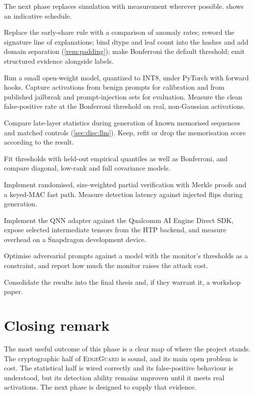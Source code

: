 The next phase replaces simulation with measurement wherever possible.  shows an
indicative schedule.

\begin{description}[leftmargin=*,style=nextline]
  \item[W1 — Fixes from this evaluation.] Replace the early-share rule with a comparison of
        anomaly rates; reword the signature line of explanations; bind dtype and leaf count into
        the hashes and add domain separation (\cref{rem:padding}); make Bonferroni the default
        threshold; emit structured evidence alongside labels.
  \item[W2 — Real activations.] Run a small open-weight model, quantized to INT8, under PyTorch
        with forward hooks. Capture activations from benign prompts for calibration and from
        published jailbreak and prompt-injection sets for evaluation. Measure the clean
        false-positive rate at the Bonferroni threshold on real, non-Gaussian activations.
  \item[W3 — Memorisation hypothesis.] Compare late-layer statistics during generation of known
        memorised sequences and matched controls (\cref{sec:disc:llm}). Keep, refit or drop the
        memorisation score according to the result.
  \item[W4 — Calibration on real data.] Fit thresholds with held-out empirical quantiles as well as
        Bonferroni, and compare diagonal, low-rank and full covariance models.
  \item[W5 — Amortised attestation.] Implement randomised, size-weighted partial verification with
        Merkle proofs and a keyed-MAC fast path. Measure detection latency against injected flips
        during generation.
  \item[W6 — Device integration.] Implement the QNN adapter against the Qualcomm AI Engine Direct
        SDK, expose selected intermediate tensors from the HTP backend, and measure overhead on a
        Snapdragon development device.
  \item[W7 — Adaptive attacker.] Optimise adversarial prompts against a model with the monitor's
        thresholds as a constraint, and report how much the monitor raises the attack cost.
  \item[W8 — Writing.] Consolidate the results into the final thesis and, if they warrant it, a
        workshop paper.
\end{description}

\section{Closing remark}

The most useful outcome of this phase is a clear map of where the project stands. The
cryptographic half of \textsc{EdgeGuard} is sound, and its main open problem is cost. The
statistical half is wired correctly and its false-positive behaviour is understood, but its
detection ability remains unproven until it meets real activations. The next phase is designed to
supply that evidence.
